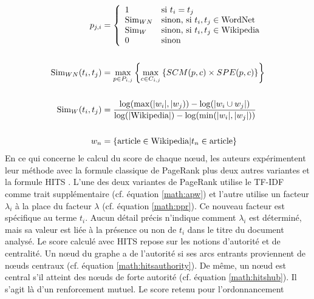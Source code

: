           \begin{align}
            p_{j, i} &= \left\{\begin{array}{ll}
              1 & \text{si $t_i = t_j$}\\
              \text{Sim}_{WN} & \text{sinon, si $t_i, t_j \in \text{WordNet}$}\\
               \text{Sim}_{W} &  \text{sinon, si $t_i, t_j \in \text{Wikipedia}$}\\
              0 & \text{sinon}
            \end{array}\right. \label{math:semanticrank}\\
            \notag\\
            \text{Sim}_{WN}(t_i, t_j) &= \max_{p \in P_{i, j}}\left\{\max_{c \in C_{i, j}}\left\{SCM(p, c) \times SPE(p, c)\right\}\right\} \label{math:wordnetsemanticrelatedness}\\
            \notag\\
            \text{Sim}_{W}(t_i, t_j) &= \frac{\log(\max(|w_i|, |w_j)) - \log(|w_i \cup w_j|)}{\log(|\text{Wikipedia}|) - \log(\min(|w_i|, |w_j|))} \label{math:wikipediasemanticrelatedness}\\
            \notag\\
            w_n &= \left\{\text{article} \in \text{Wikipedia} | t_n \in \text{article}\right\} \notag
          \end{align}
          En ce qui concerne le calcul du score de chaque n\oe{}ud, les auteurs
          expérimentent leur méthode avec la formule classique de PageRank
          \citep{brin1998pagerank} plus deux autres variantes et la formule HITS
          \citep{kleinberg1999hits}. L'une des deux variantes de PageRank utilise le
          TF-IDF comme trait supplémentaire (cf. équation \ref{math:apw}) et l'autre
          utilise un facteur $\lambda_i$ à la place du facteur $\lambda$ (cf.
          équation \ref{math:ppr}). Ce nouveau facteur est spécifique au terme
          $t_i$. Aucun détail précis n'indique comment $\lambda_i$ est déterminé,
          mais sa valeur est liée à la présence ou non de $t_i$ dans le titre du
          document analysé. Le score calculé avec HITS repose sur les notions
          d'autorité et de centralité. Un n\oe{}ud du graphe a de l'autorité si ses
          arcs entrants proviennent de n\oe{}uds centraux (cf. équation
          \ref{math:hitsauthority}). De même, un n\oe{}ud est central s'il atteint
          des n\oe{}uds de forte autorité (cf. équation \ref{math:hitshub}). Il
          s'agit là d'un renforcement mutuel. Le score retenu pour l'ordonnancement
